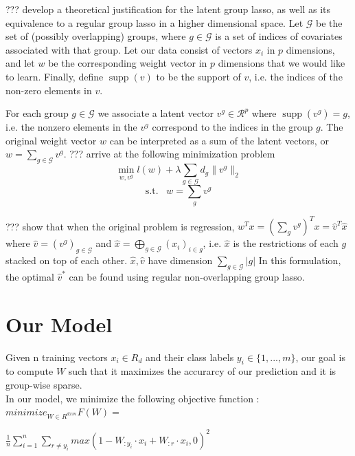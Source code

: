 \documentclass[11pt]{article}
\begin{document}
??? develop a theoretical justification for the latent group lasso, as well
as its equivalence to a regular group lasso in a higher dimensional space.
Let $\mathcal{G}$ be the set of (possibly overlapping) groups,
where $g \in \mathcal{G}$ is a set of indices of covariates associated with 
that group. 
Let our
data consist of vectors $x_i$ in $p$ dimensions, and let $w$ be the 
corresponding weight vector in $p$ dimensions that we would like to learn.
Finally, define $\operatorname{supp}(v)$ to be the support of $v$, i.e.
the indices of the non-zero elements in $v$.


For each group
$g \in \mathcal{G}$ we associate a latent vector $v^g \in \mathcal{R}^p$ where
$\operatorname{supp}(v^g) = g$, i.e. the nonzero elements in the $v^g$ correspond
to the indices in the group $g$. 
The original weight vector $w$ can be
interpreted as a sum of the latent vectors, or
$w = \sum_{g \in \mathcal{G}} v^g$. 
??? arrive at the following minimization
problem 
$$ \min_{w, v^g} l(w) + \lambda \sum_{g \in \mathcal{G}} d_g \|v^g \|_2 $$
$$\mathrm{s.t.}\;\;\; w = \sum_g v^g$$ 



??? show that when the original problem is regression, 
$w^Tx = \left(\sum_g v^g\right)^Tx = \hat{v}^T \hat{x}$ where 
$\hat{v} = (v^{g})_{g \in \mathcal{G}}$ and
$\hat{x} = \bigoplus_{g \in \mathcal{G} } (x_i)_{i \in g}$, i.e. $\hat{x}$ is
the restrictions of each $g$ stacked on top of each other. $\hat{x}, \hat{v}$ 
have dimension $\sum_{g \in \mathcal{G}} |g|$ 
In this formulation, the optimal $\hat{v}^*$ can be found using regular 
non-overlapping group lasso. 



\section{Our Model}

Given n training vectors $x_i \in R_d$ and their class labels $y_i \in \{1, ..., m\}$, our goal is to compute $W$ such that it maximizes the accurarcy of our prediction and it is group-wise sparse. \\

In our model, we minimize the following objective function : \\

$minimize_{W \in R^{d x m}} F(W) = $

$\frac{1}{n} \sum_{i=1}^{n} \sum_{r \neq y_i } max(1 - W_{:y_i} \cdot x_i + W_{:r} \cdot x_i , 0 )^2 $
\end{document}
